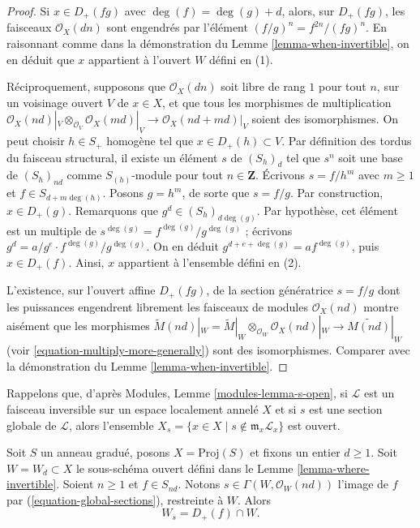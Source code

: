 \begin{proof}
Si $x \in D_{+}(fg)$ avec $\deg(f) = \deg(g) + d$, alors, sur
$D_{+}(fg)$, les faisceaux $\mathcal{O}_X(dn)$ sont engendrés par l'élément
$(f/g)^n = f^{2n}/(fg)^n$. En raisonnant comme dans la démonstration du
Lemme \ref{lemma-when-invertible}, on en déduit que $x$ appartient à l'ouvert
$W$ défini en (1).

\medskip\noindent
Réciproquement, supposons que $\mathcal{O}_X(dn)$ soit libre de rang $1$ pour
tout $n$, sur un voisinage ouvert $V$ de $x \in X$, et que tous les morphismes
de multiplication
$\mathcal{O}_X(nd)|_V \otimes_{\mathcal{O}_V} \mathcal{O}_X(md)|_V
\to \mathcal{O}_X(nd + md)|_V$ soient des isomorphismes.
On peut choisir $h \in S_{+}$ homogène tel que
$x \in D_{+}(h) \subset V$. Par définition des tordus du faisceau structural,
il existe un élément $s$ de $(S_h)_d$ tel que $s^n$ soit une base de
$(S_h)_{nd}$ comme $S_{(h)}$-module pour tout $n \in \mathbf{Z}$.
Écrivons $s = f/h^m$ avec $m \geq 1$ et
$f \in S_{d + m \deg(h)}$. Posons $g = h^m$, de sorte que $s = f/g$.
Par construction, $x \in D_{+}(g)$. Remarquons que
$g^d \in (S_h)_{d\deg(g)}$. Par hypothèse, cet élément est un multiple de
$s^{\deg(g)} = f^{\deg(g)}/g^{\deg(g)}$ ; écrivons
$g^d = a/g^e \cdot f^{\deg(g)}/g^{\deg(g)}$. On en déduit
$g^{d + e + \deg(g)} = a f^{\deg(g)}$, puis $x \in D_{+}(f)$.
Ainsi, $x$ appartient à l'ensemble défini en (2).

\medskip\noindent
L'existence, sur l'ouvert affine $D_{+}(fg)$, de la section génératrice
$s = f/g$ dont les puissances engendrent librement les faisceaux de modules
$\mathcal{O}_X(nd)$ montre aisément que les morphismes
$\widetilde M(nd)|_W = \widetilde M|_W \otimes_{\mathcal{O}_W}
\mathcal{O}_X(nd)|_W \to \widetilde{M(nd)}|_W$
(voir \ref{equation-multiply-more-generally}) sont des isomorphismes.
Comparer avec la démonstration du Lemme \ref{lemma-when-invertible}.
\end{proof}

\noindent
Rappelons que, d'après Modules, Lemme \ref{modules-lemma-s-open}, si
$\mathcal{L}$ est un faisceau inversible sur un espace localement annelé $X$
et si $s$ est une section globale de $\mathcal{L}$, alors l'ensemble
$X_s = \{x \in X \mid s \not \in \mathfrak m_x\mathcal{L}_x\}$ est ouvert.

\begin{lemma}
\label{lemma-principal-open}
Soit $S$ un anneau gradué, posons $X = \text{Proj}(S)$ et fixons un entier
$d \geq 1$. Soit $W = W_d \subset X$ le sous-schéma ouvert défini dans le
Lemme \ref{lemma-where-invertible}. Soient $n \geq 1$ et $f \in S_{nd}$.
Notons $s \in \Gamma(W, \mathcal{O}_W(nd))$ l'image de $f$ par
(\ref{equation-global-sections}), restreinte à $W$. Alors
$$
W_s = D_{+}(f) \cap W.
$$
\end{lemma}

